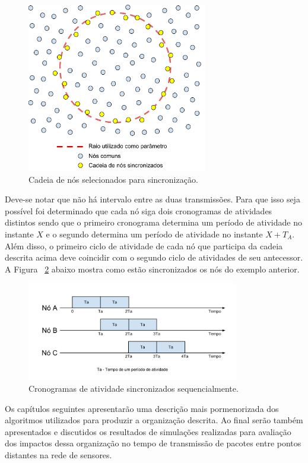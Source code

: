 \begin{figure}[!htb]
\centering
\includegraphics[width=297px,height=280px]{./Pictures/CircularBackbone.png}
\caption{Cadeia de nós selecionados para sincronização.} %
\label{fig:circularBackbone} %
\end{figure}

Deve-se notar que não há intervalo entre as duas transmissões. Para que isso seja possível foi determinado que cada nó siga dois cronogramas de atividades distintos sendo que o primeiro cronograma determina um período de atividade no instante $X$ e o segundo determina um período de atividade no instante $X + T_A$. Além disso, o primeiro ciclo de atividade de cada nó que participa da cadeia descrita acima deve coincidir com o segundo ciclo de atividades de seu antecessor. A Figura ~\ref{fig:backboneSynchronization} abaixo mostra como estão sincronizados os nós do exemplo anterior.

\begin{figure}[!htb]
\centering
\includegraphics[width=350px,height=163px]{./Pictures/SequencialSynchronization.png}
\caption{Cronogramas de atividade sincronizados sequencialmente.} %
\label{fig:backboneSynchronization} %
\end{figure}

Os capítulos seguintes apresentarão uma descrição mais pormenorizada dos algoritmos utilizados para produzir a organização descrita. Ao final serão também apresentados e discutidos os resultados de simulações realizadas para avaliação dos impactos dessa organização no tempo de transmissão de pacotes entre pontos distantes na rede de sensores.

